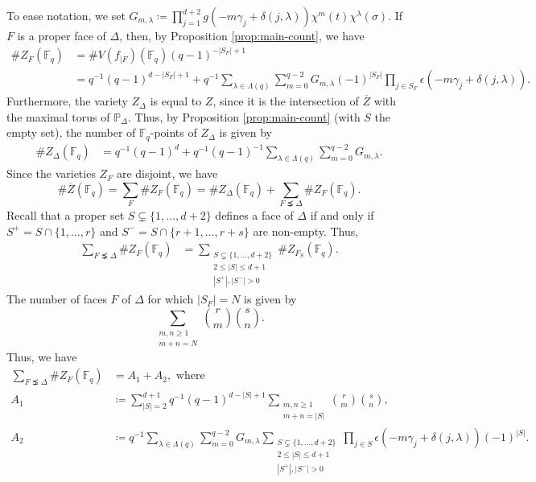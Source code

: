 \documentclass[11pt, reqno]{amsart}
\theoremstyle{plain}
\theoremstyle{definition}
\newcommand{\Ps}{\mathbb{P}}
\newcommand{\F}{\mathbb{F}}
\begin{document}
To ease notation, we set $ G_{m,\lambda}\coloneqq \prod_{j=1}^{d+2}g\left(-m\gamma_j + \delta(j,\lambda)\right) \chi^{m}(t) \chi^{\lambda}(\sigma)$.
If $F$ is  a proper face of $\Delta$, then, by Proposition \ref{prop:main-count}, we have
\begin{align}
   \#Z_F(\F_q) &= \#V(f_{|{F}})(\F_q) (q-1)^{-|S_F|+1} \nonumber\\
    &= q^{-1} (q-1)^{d-|S_F|+1} + q^{-1}\sum_{\lambda \in \Lambda(q)}  \sum_{m=0}^{q-2} G_{m,\lambda }(-1)^{|S_F|} \prod_{j\in S_F}\epsilon\left( -m \gamma_j + \delta(j,\lambda) \right).
\end{align}
Furthermore, the variety $Z_{\Delta}$ is equal to $Z$, since it is the intersection of $\overline{Z}$ with the maximal torus of $\Ps_{\Delta}$. Thus, by Proposition \ref{prop:main-count} (with $S$ the empty set), the number of $\F_q$-points of $Z_{\Delta}$ is given by
\begin{align}
    \#Z_\Delta(\F_q) &= q^{-1}(q-1)^{d} +q^{-1}(q-1)^{-1} \sum_{\lambda \in \Lambda(q)}  \sum_{m=0}^{q-2} G_{m,\lambda }.
\end{align}
Since the varieties $Z_F$ are disjoint, we have
\begin{equation}\label{eq:index-compactification-I}
  \#\overline{Z}(\F_q) = \sum_{F} \#Z_F(\F_q)= \#Z_{\Delta}(\F_q)+ \sum_{F\precneq\Delta} \#Z_F(\F_q).  
\end{equation}
Recall that a proper set $S \subsetneq \{1,\dots,d+2\}$ defines a face of $\Delta$ if and only if $S^+ = S \cap \{1,\dots,r\}$ and $S^{-} =S \cap \{r+1,\dots,r+s\}$ are non-empty. Thus,
\begin{align*}
\sum_{F\precneq\Delta} \#Z_F(\F_q) &=  \sum_{ \substack{S \subsetneq \{1,\dots,d+2\}\\  2 \le|S| \le d+1 \\ |S^{+}|,|S^{-}|>0} } \#Z_{F_S}(\F_q).
\end{align*}
The number of faces $F$ of $\Delta$ for which $|S_F|=N$ is given by
\[
\sum_{\substack{m,n\ge1\\ m+n =N}} {\binom{r}{m}}{\binom{s}{n}}.
\]
Thus, we have
\begin{align}
\sum_{F\precneq\Delta} \#Z_F(\F_q) &= A_1 +A_2, \text{ where } \\
A_1 &\coloneqq\sum_{ |S|=2 }^{d+1} q^{-1} (q-1)^{d-|S|+1}\sum_{\substack{m,n\ge1\\ m+n =|S|}} {\binom{r}{m}}{\binom{s}{n}},\nonumber \\
A_2 &\coloneqq q^{-1}\sum_{\lambda \in \Lambda(q)}  \sum_{m=0}^{q-2} G_{m,\lambda }
\sum_{ \substack{S \subsetneq \{1,\dots,d+2\}\\  2 \le|S| \le d+1 \\ |S^{+}|,|S^{-}|>0} } 
\prod_{j\in S}\epsilon\left( -m \gamma_j + \delta(j,\lambda) \right) (-1)^{|S|} .
\end{align}
\end{document}
